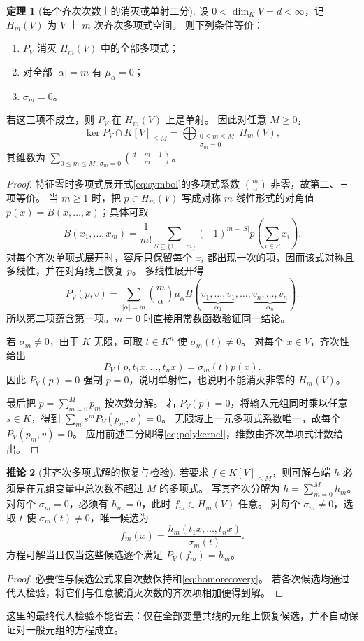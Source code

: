 \documentclass[UTF8,11pt,a4paper]{ctexart}
\theoremstyle{definition}
\newtheorem{theorem}{定理}[section]
\newtheorem{corollary}[theorem]{推论}
\begin{document}
\begin{theorem}[每个齐次次数上的消灭或单射二分]\label{thm:moment}
设 $0<\dim_KV=d<\infty$，记 $H_m(V)$ 为 $V$ 上 $m$ 次齐次多项式空间。
则下列条件等价：
\begin{enumerate}
\item $P_V$ 消灭 $H_m(V)$ 中的全部多项式；
\item 对全部 $|\alpha|=m$ 有 $\mu_\alpha=0$；
\item $\sigma_m=0$。
\end{enumerate}
若这三项不成立，则 $P_V$ 在 $H_m(V)$ 上是单射。
因此对任意 $M\ge0$，
\begin{equation}\label{eq:polykernel}
 \ker P_V\cap K[V]_{\le M}
 =\bigoplus_{\substack{0\le m\le M\\\sigma_m=0}}H_m(V),
\end{equation}
其维数为 $\sum_{0\le m\le M,\ \sigma_m=0}\binom{d+m-1}{m}$。
\end{theorem}
\begin{proof}
特征零时多项式展开式\eqref{eq:symbol}的多项式系数 $\binom m\alpha$ 非零，故第二、三项等价。
当 $m\ge1$ 时，把 $p\in H_m(V)$ 写成对称 $m$-线性形式的对角值 $p(x)=B(x,\ldots,x)$；具体可取
\[
 B(x_1,\ldots,x_m)=\frac1{m!}\sum_{S\subseteq\{1,\ldots,m\}}
 (-1)^{m-|S|}p\left(\sum_{i\in S}x_i\right).
\]
对每个齐次单项式展开时，容斥只保留每个 $x_i$ 都出现一次的项，因而该式对称且多线性，并在对角线上恢复 $p$。
多线性展开得
\[
 P_V(p,v)=\sum_{|\alpha|=m}\binom m\alpha\mu_\alpha
 B(\underbrace{v_1,\ldots,v_1}_{\alpha_1},\ldots,
   \underbrace{v_n,\ldots,v_n}_{\alpha_n}).
\]
所以第二项蕴含第一项。$m=0$ 时直接用常数函数验证同一结论。

若 $\sigma_m\ne0$，由于 $K$ 无限，可取 $t\in K^n$ 使 $\sigma_m(t)\ne0$。
对每个 $x\in V$，齐次性给出
\begin{equation}\label{eq:homorecovery}
 P_V(p,t_1x,\ldots,t_nx)=\sigma_m(t)p(x).
\end{equation}
因此 $P_V(p)=0$ 强制 $p=0$，说明单射性，也说明不能消灭非零的 $H_m(V)$。

最后把 $p=\sum_{m=0}^M p_m$ 按次数分解。
若 $P_V(p)=0$，将输入元组同时乘以任意 $s\in K$，得到
$\sum_m s^mP_V(p_m,v)=0$。
无限域上一元多项式系数唯一，故每个 $P_V(p_m,v)=0$。
应用前述二分即得\eqref{eq:polykernel}，维数由齐次单项式计数给出。
\end{proof}

\begin{corollary}[非齐次多项式解的恢复与检验]\label{cor:polyrecover}
若要求 $f\in K[V]_{\le M}$，则可解右端 $h$ 必须是在元组变量中总次数不超过 $M$ 的多项式。
写其齐次分解为 $h=\sum_{m=0}^M h_m$。
对每个 $\sigma_m=0$，必须有 $h_m=0$，此时 $f_m\in H_m(V)$ 任意。
对每个 $\sigma_m\ne0$，选取 $t$ 使 $\sigma_m(t)\ne0$，唯一候选为
\[
 f_m(x)=\frac{h_m(t_1x,\ldots,t_nx)}{\sigma_m(t)}.
\]
方程可解当且仅当这些候选逐个满足 $P_V(f_m)=h_m$。
\end{corollary}
\begin{proof}
必要性与候选公式来自次数保持和\eqref{eq:homorecovery}。
若各次候选均通过代入检验，将它们与任意被消灭次数的齐次项相加便得到解。
\end{proof}
这里的最终代入检验不能省去：仅在全部变量共线的元组上恢复候选，并不自动保证对一般元组的方程成立。
\end{document}
